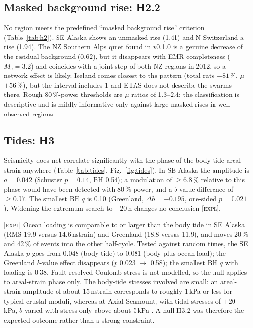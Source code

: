 \documentclass[11pt,a4paper]{article}
\newcommand{\expl}{\textnormal{\textsc{[expl]}}}
\newcommand{\Mc}{M_\mathrm{c}}
\begin{document}
\subsection{Masked background rise: H2.2}
No region meets the predefined ``masked background rise'' criterion (Table~\ref{tab:h2}). SE Alaska shows an unmasked rise (1.41) and N Switzerland a rise (1.94). The NZ Southern Alps quiet found in v0.1.0 is a genuine decrease of the residual background (0.62), but it disappears with EMR completeness ($\Mc=3.2$) and coincides with a joint step of both NZ regions in 2012, so a network effect is likely. Iceland comes closest to the pattern (total rate $-81$\,\%, $\mu$ $+56$\,\%), but the interval includes 1 and ETAS does not describe the swarms there. Rough 80\,\%-power thresholds are $\mu$ ratios of 1.3--2.4; the classification is descriptive and is mildly informative only against large masked rises in well-observed regions.

\subsection{Tides: H3}
Seismicity does not correlate significantly with the phase of the body-tide areal strain anywhere (Table~\ref{tab:tides}, Fig.~\ref{fig:tides}). In SE Alaska the amplitude is $a=0.042$ (Schuster $p=0.14$, BH 0.54); a modulation of $\geq6.8$\,\% relative to this phase would have been detected with 80\,\% power, and a $b$-value difference of $\geq0.07$. The smallest BH $q$ is 0.10 (Greenland, $\Delta b=-0.195$, one-sided $p=0.021$). Widening the extremum search to $\pm20$\,h changes no conclusion \expl.

\expl{} Ocean loading is comparable to or larger than the body tide in SE Alaska (RMS 19.9 versus 14.6\,nstrain) and Greenland (18.8 versus 11.9), and moves 20\,\% and 42\,\% of events into the other half-cycle. Tested against random times, the SE Alaska $p$ goes from 0.048 (body tide) to 0.081 (body plus ocean load); the Greenland $b$-value effect disappears ($p$ 0.023 $\to$ 0.58); the smallest BH $q$ with loading is 0.38. Fault-resolved Coulomb stress is not modelled, so the null applies to areal-strain phase only. The body-tide stresses involved are small: an areal-strain amplitude of about 15\,nstrain corresponds to roughly 1\,kPa or less for typical crustal moduli, whereas at Axial Seamount, with tidal stresses of $\pm20$\,kPa, $b$ varied with stress only above about 5\,kPa \parencite{tan2019}. A null H3.2 was therefore the expected outcome rather than a strong constraint.
\end{document}
